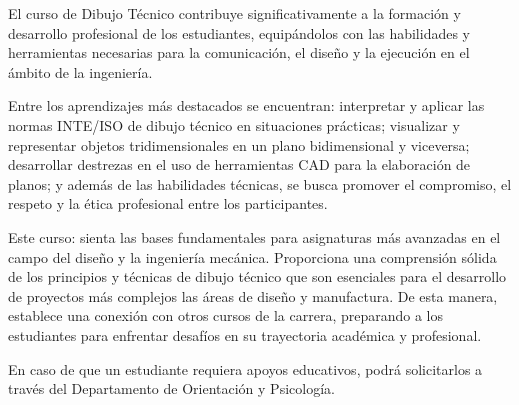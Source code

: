 \documentclass[letterpaper]{article}%
\begin{document}
\begin{tcolorbox}[
blanker,
width=0.78\textwidth,enlarge left by=0.24\textwidth,
before skip=6pt,
breakable,
overlay unbroken and first={%
    \node[inner sep=0pt,outer sep=0pt,text width=0.22\textwidth,
    align=none,
    below right]
    at ([xshift=-0.24\textwidth]frame.north west)
{
\hspace*{0mm}\fontsize{12}{14}\selectfont \textbf{\textcolor{parte}{2 Descripción general}}
};}]
El curso de Dibujo Técnico contribuye significativamente a la formación y desarrollo profesional de los estudiantes, equipándolos con las habilidades y herramientas necesarias para la comunicación, el diseño y la ejecución en el ámbito de la ingeniería.

Entre los aprendizajes más destacados se encuentran:  interpretar y aplicar las normas INTE/ISO de dibujo técnico en situaciones prácticas; visualizar y representar objetos tridimensionales en un plano bidimensional y viceversa; desarrollar destrezas en el uso de herramientas CAD para la elaboración de planos; y además de las habilidades técnicas, se busca promover el compromiso, el respeto y la ética profesional entre los participantes.​

Este curso: sienta las bases fundamentales para asignaturas más avanzadas en el campo del diseño y la ingeniería mecánica. Proporciona una comprensión sólida de los principios y técnicas de dibujo técnico que son esenciales para el desarrollo de proyectos más complejos las áreas de diseño y manufactura. De esta manera, establece una conexión con otros cursos de la carrera, preparando a los estudiantes para enfrentar desafíos en su trayectoria académica y profesional.​

En caso de que un estudiante requiera apoyos educativos, podrá solicitarlos a través del Departamento de Orientación y Psicología. 
\end{tcolorbox}
%
\vspace*{10mm}%
\end{document}
